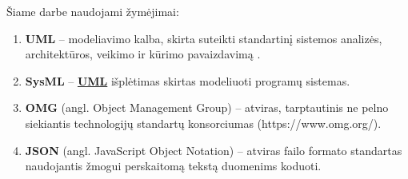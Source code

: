 \documentclass{VUMIFInfBakalaurinis}
\newcommand{\bhyperref}[2]{\hyperref[#1]{\textbf{#2}}}
\newcommand{\BPMN}{\bhyperref{section:bpmn}{BPMN}}
\newcommand{\UML}{\bhyperref{def:uml}{UML}}
\begin{document}
\printbibliography[heading=bibintoc] %

Šiame darbe naudojami žymėjimai:
\begin{enumerate}
	\item \textbf{UML} – modeliavimo kalba, skirta suteikti standartinį sistemos analizės, architektūros, veikimo ir kūrimo pavaizdavimą \cite{omgUmlFormal}. \label{def:uml}
	\item \textbf{SysML} – \UML{} išplėtimas skirtas modeliuoti programų sistemas. \cite{OMGSysML} \label{def:sysml}
	\item \textbf{OMG} (angl. Object Management Group) – atviras, tarptautinis ne pelno siekiantis technologijų standartų konsorciumas (https://www.omg.org/). \label{def:omg}
  \item \textbf{JSON} (angl. JavaScript Object Notation) – atviras failo formato standartas naudojantis žmogui perskaitomą tekstą duomenims koduoti. \label{def:json}
\end{enumerate}

\appendix  %
\end{document}

